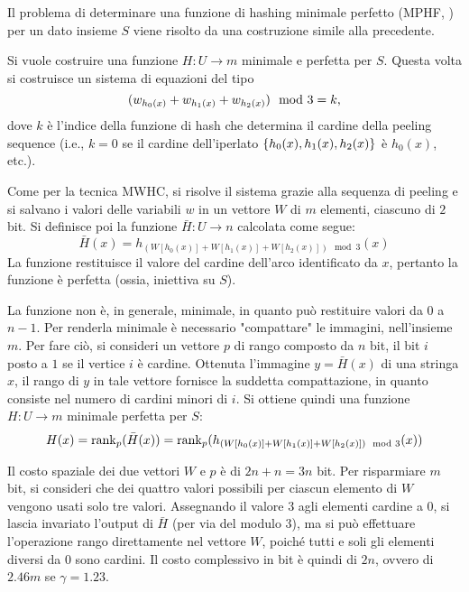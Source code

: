 Il problema di determinare una funzione di hashing minimale perfetto (MPHF, ) per un dato insieme $S$ viene risolto da una costruzione simile alla precedente. \cite{Majewski:96:MWHC}

Si vuole costruire una funzione $H:U\to m$ minimale e perfetta per $S$.
Questa volta si costruisce un sistema di equazioni del tipo
\begin{equation*}
	(w_{h_0(x)} + w_{h_1(x)} + w_{h_2(x)}) \mod 3 = k \text,
\end{equation*}
dove $k$ è l'indice della funzione di hash che determina il cardine della peeling sequence (i.e., $k=0$ se il cardine dell'iperlato $\left\{ h_0(x),h_1(x),h_2(x) \right\}$ è $h_0(x)$, etc.).

Come per la tecnica MWHC, si risolve il sistema grazie alla sequenza di peeling e si salvano i valori delle variabili $w$ in un vettore $W$ di $m$ elementi, ciascuno di $2$ bit.
Si definisce poi la funzione $\bar H:U\to n$ calcolata come segue:
\begin{equation*}
	\bar H(x) = h_{(W[h_0(x)] + W[h_1(x)] + W[h_2(x)]) \mod 3}(x)
\end{equation*}
La funzione restituisce il valore del cardine dell'arco identificato da $x$, pertanto la funzione è perfetta (ossia, iniettiva su $S$).

La funzione non è, in generale, minimale, in quanto può restituire valori da $0$ a $n-1$.
Per renderla minimale è necessario "compattare" le immagini, nell'insieme $m$.
Per fare ciò, si consideri un vettore $p$ di rango composto da $n$ bit, il bit $i$ posto a $1$ se il vertice $i$ è cardine.
Ottenuta l'immagine $y=\bar H(x)$ di una stringa $x$, il rango di $y$ in tale vettore fornisce la suddetta compattazione, in quanto consiste nel numero di cardini minori di $i$.
Si ottiene quindi una funzione $H:U\to m$ minimale perfetta per $S$:
\begin{equation*}
	H(x) = \mathrm{rank}_p(\bar H(x))
	= \mathrm{rank}_p(h_{(W[h_0(x)] + W[h_1(x)] + W[h_2(x)]) \mod 3}(x))
\end{equation*}

Il costo spaziale dei due vettori $W$ e $p$ è di $2n+n=3n$ bit.
Per risparmiare $m$ bit, si consideri che dei quattro valori possibili per ciascun elemento di $W$ vengono usati solo tre valori.
Assegnando il valore $3$ agli elementi cardine a $0$, si lascia invariato l'output di $\bar H$ (per via del modulo $3$), ma si può effettuare l'operazione rango direttamente nel vettore $W$, poiché tutti e soli gli elementi diversi da $0$ sono cardini.
Il costo complessivo in bit è quindi di $2n$, ovvero di $2.46m$ se $\gamma=1.23$.
